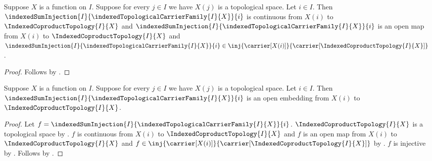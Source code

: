 \begin{theorem}\label{indexed_coproduct_injection_is_continuous_open_injection}
    Suppose $X$ is a function on $I$.
    Suppose for every $j\in I$ we have $X(j)$ is a topological space.
    Let $i\in I$.
    Then $\indexedSumInjection{I}{
        \indexedTopologicalCarrierFamily{I}{X}}{i}$ is continuous from
        $X(i)$ to $\IndexedCoproductTopology{I}{X}$ and
        $\indexedSumInjection{I}{
            \indexedTopologicalCarrierFamily{I}{X}}{i}$ is an open map
        from $X(i)$ to $\IndexedCoproductTopology{I}{X}$ and
        $\indexedSumInjection{I}{
            \indexedTopologicalCarrierFamily{I}{X}}{i}
        \in\inj{\carrier[X(i)]}{
            \carrier[\IndexedCoproductTopology{I}{X}]}$.
\end{theorem}
\begin{proof}
    Follows by
        .
\end{proof}

\begin{theorem}\label{indexed_coproduct_injection_is_open_embedding}
    Suppose $X$ is a function on $I$.
    Suppose for every $j\in I$ we have $X(j)$ is a topological space.
    Let $i\in I$.
    Then $\indexedSumInjection{I}{\indexedTopologicalCarrierFamily{I}{X}}{i}$
        is an open embedding from $X(i)$ to $\IndexedCoproductTopology{I}{X}$.
\end{theorem}
\begin{proof}
    Let $f=\indexedSumInjection{I}{\indexedTopologicalCarrierFamily{I}{X}}{i}$.
    $\IndexedCoproductTopology{I}{X}$ is a topological space by
        .
    $f$ is continuous from $X(i)$ to $\IndexedCoproductTopology{I}{X}$ and
        $f$ is an open map from $X(i)$ to $\IndexedCoproductTopology{I}{X}$ and
        $f\in\inj{\carrier[X(i)]}{\carrier[\IndexedCoproductTopology{I}{X}]}$ by
        .
    $f$ is injective by .
    Follows by .
\end{proof}
